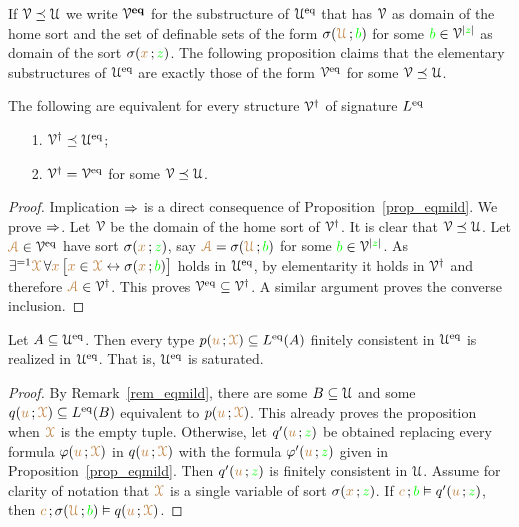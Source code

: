 \documentclass[creche.tex]{subfiles}
\begin{document}
If $\EuScript V\preceq\EuScript U$ we write \emph{$\EuScript V^{\textbf{eq}}$\/} for the substructure of $\EuScript U^{{\rm eq}}$ that has $\EuScript V$ as domain of the home sort and  the set of definable sets of the form $\sigma({\color{brown}\EuScript U}\,;{\color{green} b})$ for some ${\color{green} b}\in \EuScript V^{|{\color{green} z}|}$ as domain of the sort $\sigma({\color{brown} x}\,;{\color{green} z})$. 
The following proposition claims that the elementary substructures of $\EuScript U^{{\rm eq}}$ are exactly those of the form $\EuScript V^{{\rm eq}}$ for some $\EuScript V\preceq\EuScript U$. 

\begin{proposition}
The following are equivalent for every structure $\EuScript V^\dag$ of signature $L^{{\rm eq}}$
\begin{itemize}
\item[1.] $\EuScript V^\dag\preceq\EuScript U^{{\rm eq}}$;
\item[2.] $\EuScript V^\dag=\EuScript V^{{\rm eq}}$ for some $\EuScript V\preceq\EuScript U$.
\end{itemize}
\end{proposition}
\begin{proof}
Implication $\Rightarrow$ is a direct consequence of Proposition~\ref{prop_eqmild}. We prove $\Rightarrow$. Let $\EuScript V$ be the domain of the home sort of $\EuScript V^\dag$. It is clear that $\EuScript V\preceq\EuScript U$. Let ${\color{brown}\EuScript A}\in\EuScript V^{{\rm eq}}$  have sort $\sigma({\color{brown} x}\,;{\color{green} z})$, say ${\color{brown}\EuScript A}=\sigma({\color{brown}\EuScript U}\,;{\color{green} b})$ for some ${\color{green} b}\in\EuScript V^{|{\color{green} z}|}$. As $\exists^{=1}{\color{brown}\EuScript X}\, \forall{\color{brown}x}\,\big[{\color{brown} x}\in{\color{brown}\EuScript X}\leftrightarrow\sigma({\color{brown} x}\,;{\color{green} b})\big]$ holds in $\EuScript U^{{\rm eq}}$, by elementarity it holds in $\EuScript V^\dag$ and therefore ${\color{brown}\EuScript A}\in\EuScript V^\dag$. This proves $\EuScript V^{{\rm eq}}\subseteq\EuScript V^\dag$. A similar argument proves the converse inclusion.
\end{proof}

\begin{proposition}\label{prop_Ueq_saturated}
Let $A\subseteq\EuScript U^{{\rm eq}}$. Then every type $p({\color{brown} u}\,;{\color{brown}\EuScript X})\subseteq L^{{\rm eq}}(A)$ finitely consistent in $\EuScript U^{{\rm eq}}$ is realized in $\EuScript U^{{\rm eq}}$. That is, $\EuScript U^{{\rm eq}}$ is saturated.
\end{proposition}
\begin{proof}
By Remark~\ref{rem_eqmild}, there are some $B\subseteq\EuScript U$ and some $q({\color{brown} u}\,;{\color{brown}\EuScript X})\subseteq L^{{\rm eq}}(B)$ equivalent to $p({\color{brown} u}\,;{\color{brown}\EuScript X})$. This already proves the proposition when ${\color{brown}\EuScript X}$ is the empty tuple. Otherwise, let $q'({\color{brown} u}\,;{\color{green} z})$ be obtained replacing every formula $\varphi({\color{brown} u}\,;{\color{brown}\EuScript X})$ in $q({\color{brown} u}\,;{\color{brown}\EuScript X})$ with the formula $\varphi'({\color{brown} u}\,;{\color{green} z})$ given in Proposition~\ref{prop_eqmild}. Then $q'({\color{brown} u}\,;{\color{green} z})$ is finitely consistent in $\EuScript U$. Assume for clarity of notation that ${\color{brown}\EuScript X}$ is a single variable of sort $\sigma({\color{brown} x}\,;{\color{green} z})$. If ${\color{brown} c}\,;{\color{green} b}\vDash q'({\color{brown} u}\,;{\color{green} z})$, then  ${\color{brown} c}\,;\sigma({\color{brown}\EuScript U}\,;{\color{green} b})\vDash q({\color{brown} u}\,;{\color{brown}\EuScript X})$.
\end{proof}
\end{document}

